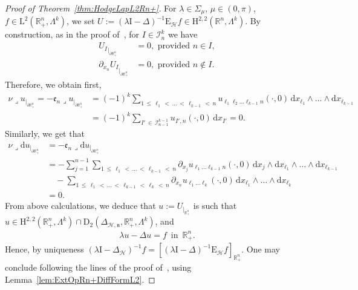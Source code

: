 \documentclass[10pt]{amsart}
\theoremstyle{definition}\newtheorem{defi}[theo]{Definition}\newtheorem{rema}[theo]{Remark}\newtheorem{exam}[theo]{Example}\newtheorem{exem}[theo]{Example}\newtheorem{nota}[theo]{Notation}
\newcommand{\bbR}{\mathbb{R}}
\newcommand{\rmH}{\mathrm{H}}%
\newcommand{\rmd}{\mathrm{d}}
\newcommand{\rmD}{\mathrm{D}}
\newcommand{\rmL}{\mathrm{L}}
\newcommand{\rmE}{\mathrm{E}}
\newcommand{\rmI}{\mathrm{I}}
\newcommand{\clH}{\mathcal{H}}
\newcommand{\clI}{\mathcal{I}}
\newcommand{\fkn}{\mathfrak{n}}
\newcommand{\fke}{\mathfrak{e}}
\newcommand{\iprod}{\mathbin{\lrcorner}}
\begin{document}
\begin{proof}[{Proof of Theorem~\ref{thm:HodgeLapL2Rn+}}]
For $\lambda\in\Sigma_{\mu}$, $\mu\in(0,\pi)$, $f\in\rmL^2(\bbR^n_+,\Lambda^k)$, we set $U:=(\lambda \rmI -\Delta)^{-1}\rmE _{\clH}f\in \rmH^{2,2}(\bbR^n,\Lambda^k)$. By construction, as in the proof of~\cite[Proposition~5.1]{Gaudin2022}, for $I\in\clI^k_n$ we have
\begin{align*}
{U_I}_{|_{\partial\bbR^n_+}} &= 0, \text{ provided } n\in I,\\
{\partial_{x_n}U_I}_{|_{\partial\bbR^n_+}} &= 0, \text{ provided } n\notin I.
\end{align*}
Therefore, we obtain first,
\begin{align*}
\nu\iprod u_{|_{\partial\bbR^n_+}}=-\fke _n\iprod u_{|_{\partial\bbR^n_+}} &= (-1)^k\sum_{1\,\leqslant\,\ell_1\,<\,\ldots\,<\,\ell_{k-1}\,<\,n} u_{\ell_1 \ell_2\ldots \ell_{k-1} n}(\cdot,0)\, \rmd x_{\ell_1}\wedge\ldots\wedge\rmd x_{\ell_{k-1}}\\
&= (-1)^k\sum_{I'\,\in\,\clI^{k-1}_{n-1}} u_{I', n}(\cdot,0)\,\rmd x_{I'} = 0.
\end{align*}
Similarly, we get that
\begin{align*}
\nu\iprod \rmd u_{|_{\partial\bbR^n_+}}&=-\fke _n\iprod \rmd u_{|_{\partial\bbR^n_+}}\\
&= -\sum_{j=1}^{n-1}\sum_{1\,\leqslant \,\ell_1\,<\,\ldots\,<\,\ell_{k-1}\,<\,n} \partial_{x_j}u_{\ell_1 \ldots \ell_{k-1} n}(\cdot,0)\, \rmd x_{j}\wedge\rmd x_{\ell_1}\wedge\ldots\wedge\rmd x_{\ell_{k-1}}\\
&\quad -\sum_{1\,\leqslant\, \ell_1\,<\,\ldots\,<\,\ell_{k-1}\,<\,\ell_{k}\,<\,n} \partial_{x_n}u_{\ell_1 \ldots \ell_{k} }(\cdot,0)\,\rmd x_{\ell_1}\wedge\ldots\wedge\rmd x_{\ell_{k}}\\
&= 0.
\end{align*}
From above calculations, we deduce that $u:=U_{|_{\bbR^n_+}}$ is such that $u\in\rmH^{2,2}(\bbR^n_+,\Lambda^k)\cap\rmD_2(\Delta_{\clH,\fkn},\bbR^n_+,\Lambda^k)$, and
\begin{align*}
\lambda u -\Delta u = f \,\text{ in }\, \bbR^n_+ .
\end{align*}
Hence, by uniqueness $(\lambda \rmI -\Delta_{\clH})^{-1}f=[(\lambda \rmI -\Delta)^{-1}\rmE _{\clH}f]_{\bbR^n_+}$. One may conclude following the lines of the proof of~\cite[Proposition~5.1]{Gaudin2022}, using Lemma~\ref{lem:ExtOpRn+DiffFormL2}.
\end{proof}
\end{document}
